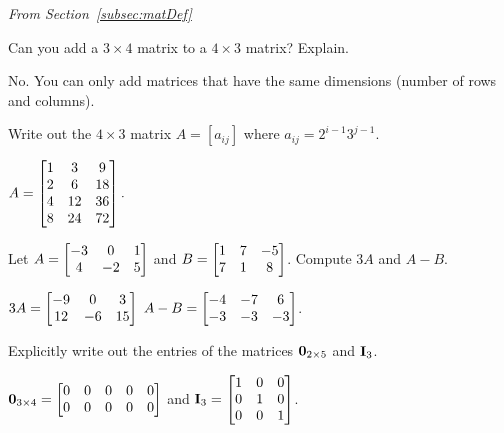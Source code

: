 \noindent
{\em From Section~\ref{subsec:matDef}}


\begin{requ}
Can you add a $3\times 4$ matrix to a $4\times 3$ matrix? Explain.
\begin{requanswer} 
No. You can only add matrices that have the same 
dimensions (number of rows and columns).
\end{requanswer}
\end{requ}


\begin{requ}
Write out the $4\times 3$ matrix $A = [a_{ij}]$ where
$a_{ij} = 2^{i-1}3^{j-1}$.
\begin{requanswer} $A = \begin{bmatrix} 
1 & 3 & 9 \cr
2 & 6 & 18 \cr 
4 & 12 & 36 \cr 
8 & 24 & 72 \cr \end{bmatrix}.$  
\end{requanswer}
\end{requ}

\begin{requ}
Let 
$A=\begin{bmatrix} 
-3 & 0 & 1 \cr 
4 & -2 & 5 \cr\end{bmatrix}$
and 
$B=\begin{bmatrix} 
1 & 7 & -5 \cr 
7 & 1 & 8 \cr\end{bmatrix}$.
Compute $3A$ and $A-B$.
\begin{requanswer}
$3A=\begin{bmatrix} 
-9& 0 & 3 \cr 
12 & -6 & 15 \cr\end{bmatrix}$
$A-B=\begin{bmatrix} 
-4& -7 & 6 \cr 
-3 & -3 & -3 \cr\end{bmatrix}$.
\end{requanswer}
\end{requ}

\begin{requ}
Explicitly write out the entries of the matrices 
${\bf 0}_{2\times 5}$ and ${\bf I}_3$.
\begin{requanswer}
${\bf 0}_{3\times 4}=
\begin{bmatrix}0 & 0 & 0 & 0 &0 \cr 
0 & 0 & 0 & 0 &0\cr \end{bmatrix}$
and 
 ${\bf I}_3=
\begin{bmatrix}
1 & 0 & 0 \cr 
0 & 1 & 0 \cr 
0 & 0 & 1 \cr\end{bmatrix}$.
\end{requanswer}
\end{requ}


